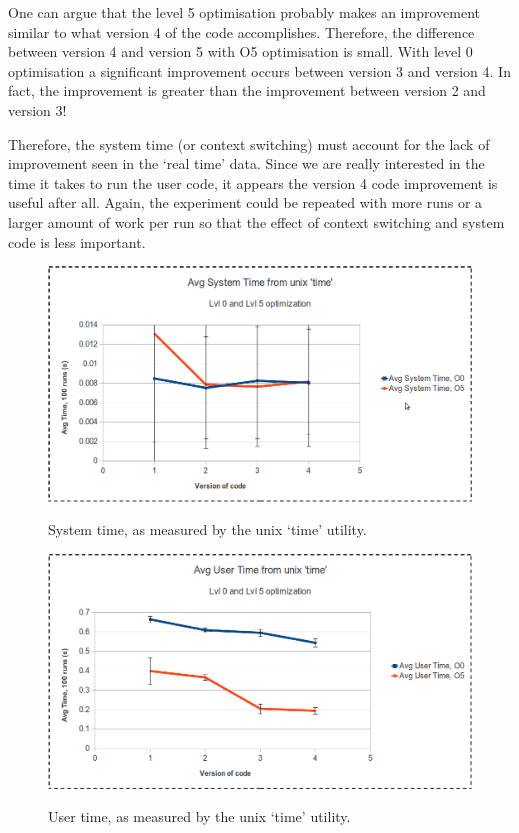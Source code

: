 \documentclass{article}
\begin{document}
One can argue that the level 5 optimisation probably makes an improvement similar to what version 4 of the code accomplishes. Therefore, the difference between version 4 and version 5 with O5 optimisation is small. With level 0 optimisation a significant improvement occurs between version 3 and version 4. In fact, the improvement is greater than the improvement between version 2 and version 3!  

Therefore, the system time (or context switching) must account for the lack of improvement seen in the `real time' data. Since we are really interested in the time it takes to run the user code, it appears the version 4 code improvement is useful after all. Again, the experiment could be repeated with more runs or a larger amount of work per run so that the effect of context switching and system code is less important. 

\begin{figure}[H]  
\centering
\caption{System time, as measured by the unix `time' utility.}
\includegraphics[scale=.40]{system_time.png}
\label{fig:system_time}
\end{figure}

\begin{figure}[H]   
\centering
\caption{User time, as measured by the unix `time' utility.}
\includegraphics[scale=.40]{user_time.png}
\label{fig:user_time}
\end{figure}
\end{document}
